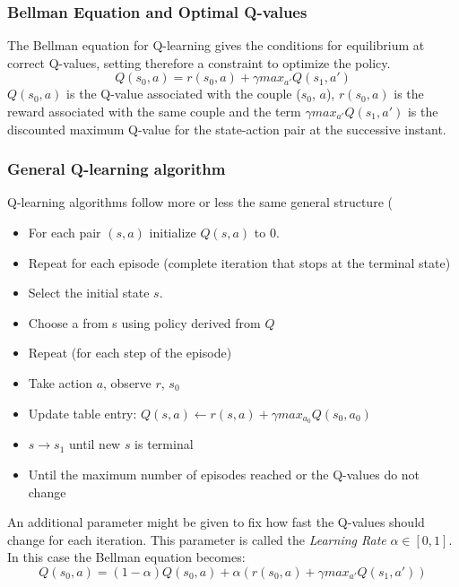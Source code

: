 \subsubsection{Bellman Equation and Optimal Q-values}

The Bellman equation for Q-learning gives the conditions for equilibrium at correct Q-values, setting therefore a constraint to optimize the policy.
\begin{equation}
Q(s_{0}, a) = r(s_{0},a ) + \gamma  max_{a'}Q(s_1, a') 
\end{equation}
$Q(s_{0}, a)$ is the Q-value associated with the couple ($s_{0}$, $a$), $r(s_{0},a )$ is the reward associated with the same couple and the term $\gamma  max_{a'}Q(s_1, a')$ is the discounted maximum Q-value for the state-action pair at the successive instant.

\subsubsection{General Q-learning algorithm}

Q-learning algorithms follow more or less the same general structure (%
\begin{itemize}
    \item For each pair $(s, a)$ initialize $Q(s, a)$ to 0.
    \item Repeat for each episode (complete iteration that stops at the terminal state)
    \item Select the initial state $s$.
    \item Choose a from s using policy derived from $Q$
    \item Repeat (for each step of the episode)
    \item Take action $a$, observe $r$, $s_{0}$ 
    \item Update table entry: $Q(s,a) \leftarrow r(s,a) + \gamma max_{a_{0}}Q(s_{0},a_{0})$
    \item $s \rightarrow{} s_{1}$ until new $s$ is terminal
    \item Until the maximum number of episodes reached or the Q-values do not change
\end{itemize}

An additional parameter might be given to fix how fast the Q-values should change for each iteration. This parameter is called the \emph{Learning Rate} $\alpha \in [0,1]$. In this case the Bellman equation becomes:
\begin{equation}
Q(s_{0}, a) = (1-\alpha)Q(s_{0}, a) + \alpha(r(s_{0},a ) + \gamma  max_{a'}Q(s_1, a')) 
\end{equation}
